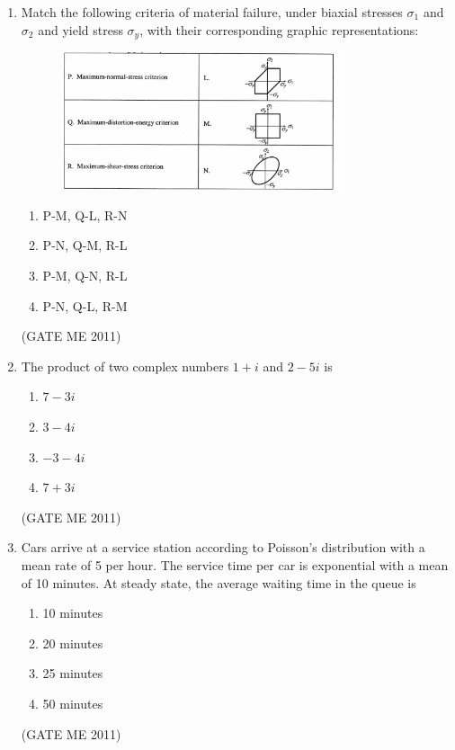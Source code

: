 \documentclass[journal]{IEEEtran}
\begin{document}
\begin{enumerate}
\item Match the following criteria of material failure, under biaxial stresses $\sigma_1$ and $\sigma_2$ and yield stress $\sigma_y$, with their corresponding graphic representations:

\begin{figure}[H]
    \centering
    \includegraphics[width=0.8\textwidth]{Fig 3.png}
    \caption{}
    \label{fig:question17}
\end{figure}

\begin{multicols}{2}
\begin{enumerate}
\item P-M, Q-L, R-N  
\item P-N, Q-M, R-L  
\item P-M, Q-N, R-L  
\item P-N, Q-L, R-M  
\end{enumerate}
\end{multicols}   
\hfill (GATE ME 2011)  

\item The product of two complex numbers $1+i$ and $2-5i$ is
\begin{multicols}{2}
\begin{enumerate}
\item $7 - 3i$  
\item $3 - 4i$  
\item $-3 - 4i$  
\item $7 + 3i$  
\end{enumerate}
\end{multicols}   
\hfill (GATE ME 2011)  

\item Cars arrive at a service station according to Poisson's distribution with a mean rate of 5 per hour. The service time per car is exponential with a mean of 10 minutes. At steady state, the average waiting time in the queue is
\begin{multicols}{4}
\begin{enumerate}
\item 10 minutes  
\item 20 minutes  
\item 25 minutes  
\item 50 minutes  
\end{enumerate} 
\end{multicols}   
\hfill (GATE ME 2011)  


\end{enumerate}
\end{document}
